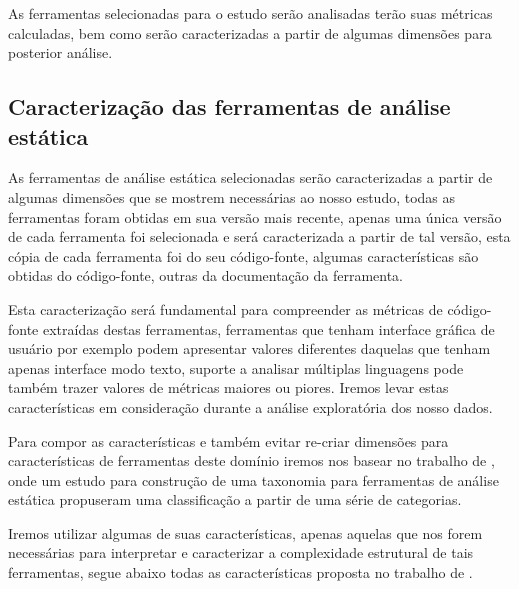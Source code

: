 As ferramentas selecionadas para o estudo serão analisadas terão suas métricas
calculadas, bem como serão caracterizadas a partir de algumas dimensões para
posterior análise.

\subsection{Caracterização das ferramentas de análise estática}

As ferramentas de análise estática selecionadas serão caracterizadas
a partir de algumas dimensões que se mostrem necessárias ao nosso estudo, todas
as ferramentas foram obtidas em sua versão mais recente, apenas uma única versão
de cada ferramenta foi selecionada e será caracterizada a partir de tal versão,
esta cópia de cada ferramenta foi do seu código-fonte, algumas características
são obtidas do código-fonte, outras da documentação da ferramenta.

Esta caracterização será fundamental para compreender as métricas de código-fonte
extraídas destas ferramentas,
ferramentas que tenham interface gráfica de usuário por exemplo podem apresentar
valores diferentes daquelas que tenham apenas interface modo texto, suporte
a analisar múltiplas linguagens pode também trazer valores de métricas maiores ou
piores. Iremos levar estas características em consideração durante a análise
exploratória dos nosso dados.

Para compor as características e também evitar re-criar dimensões para características
de ferramentas deste domínio iremos nos basear no trabalho de
, onde um estudo para construção de uma taxonomia para
ferramentas de análise estática propuseram uma classificação a partir de uma
série de categorias.

Iremos utilizar algumas de suas características, apenas aquelas que nos forem necessárias
para interpretar e caracterizar a complexidade estrutural de tais ferramentas, segue abaixo todas
as características proposta no trabalho de .

